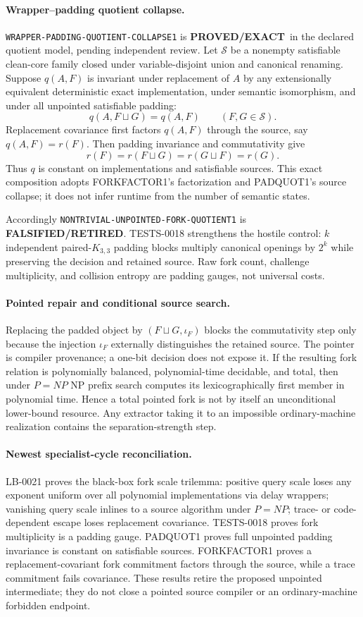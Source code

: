 \documentclass[11pt]{article}
\newcommand{\statusproved}{\textcolor{proved}{\textbf{PROVED/EXACT}}}
\newcommand{\statusretired}{\textcolor{retired}{\textbf{FALSIFIED/RETIRED}}}
\begin{document}
\paragraph{Wrapper--padding quotient collapse.}
\texttt{WRAPPER-PADDING-QUOTIENT-COLLAPSE1} is \statusproved\ in the
declared quotient model, pending independent review. Let $\mathcal S$ be a
nonempty satisfiable clean-core family closed under variable-disjoint union
and canonical renaming. Suppose $q(A,F)$ is invariant under replacement of
$A$ by any extensionally equivalent deterministic exact implementation,
under semantic isomorphism, and under all unpointed satisfiable padding:
\[
 q(A,F\sqcup G)=q(A,F)\qquad(F,G\in\mathcal S).
\]
Replacement covariance first factors $q(A,F)$ through the source, say
$q(A,F)=r(F)$. Then padding invariance and commutativity give
\[
 r(F)=r(F\sqcup G)=r(G\sqcup F)=r(G).
\]
Thus $q$ is constant on implementations and satisfiable sources. This exact
composition adopts FORKFACTOR1's factorization and PADQUOT1's source collapse;
it does not infer runtime from the number of semantic states.

Accordingly \texttt{NONTRIVIAL-UNPOINTED-FORK-QUOTIENT1} is
\statusretired. TESTS-0018 strengthens the hostile control: $k$ independent
paired-$K_{3,3}$ padding blocks multiply canonical openings by $2^k$ while
preserving the decision and retained source. Raw fork count, challenge
multiplicity, and collision entropy are padding gauges, not universal costs.

\paragraph{Pointed repair and conditional source search.}
Replacing the padded object by $(F\sqcup G,\iota_F)$ blocks the commutativity
step only because the injection $\iota_F$ externally distinguishes the
retained source. The pointer is compiler provenance; a one-bit decision does
not expose it. If the resulting fork relation is polynomially balanced,
polynomial-time decidable, and total, then under $P=NP$ NP prefix search
computes its lexicographically first member in polynomial time. Hence a total
pointed fork is not by itself an unconditional lower-bound resource. Any
extractor taking it to an impossible ordinary-machine realization contains
the separation-strength step.

\paragraph{Newest specialist-cycle reconciliation.}
LB-0021 proves the black-box fork scale trilemma: positive query scale loses
any exponent uniform over all polynomial implementations via delay wrappers;
vanishing query scale inlines to a source algorithm under $P=NP$; trace- or
code-dependent escape loses replacement covariance. TESTS-0018 proves fork
multiplicity is a padding gauge. PADQUOT1 proves full unpointed padding
invariance is constant on satisfiable sources. FORKFACTOR1 proves a
replacement-covariant fork commitment factors through the source, while a
trace commitment fails covariance. These results retire the proposed
unpointed intermediate; they do not close a pointed source compiler or an
ordinary-machine forbidden endpoint.
\end{document}
